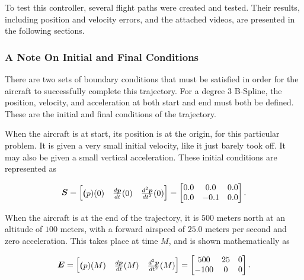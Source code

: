 To test this controller, several flight paths were created and tested. 
Their results, including position and velocity errors, and the attached videos, are presented in the following sections.

\subsubsection{A Note On Initial and Final Conditions}

There are two sets of boundary conditions that must be satisfied in order for the aircraft to successfully complete this trajectory. 
For a degree 3 B-Spline, the position, velocity, and acceleration at both start and end must both be defined. 
These are the initial and final conditions of the trajectory.

When the aircraft is at start, its position is at the origin, for this particular problem. 
It is given a very small initial velocity, like it just barely took off. 
It may also be given a small vertical acceleration.
These initial conditions are represented as

\begin{align}
    \boldsymbol{S} = 
    \begin{bmatrix}
        \boldsymbol{(}p)(0) & \frac{d\boldsymbol{p}}{dt}(0) & \frac{d^2 \boldsymbol{p}}{dt^2}(0)
    \end{bmatrix}
    =
    \begin{bmatrix}
        0.0 & 0.0 & 0.0\\
        0.0 & -0.1 & 0.0\\
    \end{bmatrix}.
\end{align}

When the aircraft is at the end of the trajectory, it is $500$ meters north at an altitude of $100$ meters, with a forward airspeed of $25.0$ meters per second and zero acceleration. 
This takes place at time $M$, and is shown mathematically as

\begin{align}
    \boldsymbol{E} = 
    \begin{bmatrix}
        \boldsymbol{(}p)(M) & \frac{d\boldsymbol{p}}{dt}(M) & \frac{d^2 \boldsymbol{p}}{dt^2}(M)
    \end{bmatrix}
    =
    \begin{bmatrix}
        500 & 25 & 0\\
        -100 & 0 & 0\\
    \end{bmatrix}.
\end{align}

